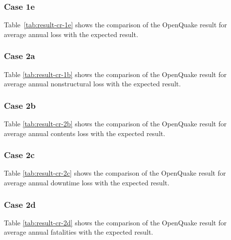 \subsubsection{Case 1e}


Table~\ref{tab:result-cr-1e} shows the comparison of the OpenQuake result for average annual loss with the expected result.

\subsubsection{Case 2a}


Table \ref{tab:result-cr-1b} shows the comparison of the OpenQuake result for average annual nonstructural loss with the expected result.

\subsubsection{Case 2b}


Table \ref{tab:result-cr-2b} shows the comparison of the OpenQuake result for average annual contents loss with the expected result.

\subsubsection{Case 2c}


Table \ref{tab:result-cr-2c} shows the comparison of the OpenQuake result for average annual downtime loss with the expected result.

\subsubsection{Case 2d}


Table \ref{tab:result-cr-2d} shows the comparison of the OpenQuake result for average annual fatalities with the expected result.

